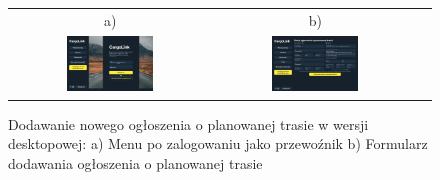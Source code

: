 \begin{figure}[H]
 \centering
  \begin{tabular}{@{}ccc@{}}
  a) & b)\\
  \includegraphics[width=0.45\textwidth]{rozdzial1/menu_d_przewoznik.jpg} &
  \includegraphics[width=0.45\textwidth]{rozdzial1/nowe_ogloszenie_d.jpg}
  \end{tabular}
 \caption{Dodawanie nowego ogłoszenia o planowanej trasie w wersji desktopowej: a) Menu po zalogowaniu jako przewoźnik b) Formularz dodawania ogłoszenia o planowanej trasie}
 \label{Rys. fig:Dodawanie nowego ogłoszenia o planowanej trasie - ab - desktop}
\end{figure}

